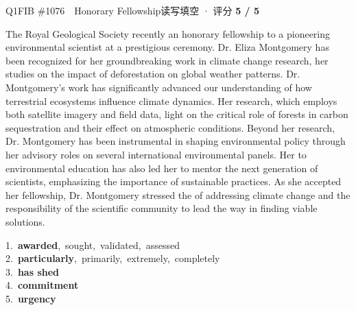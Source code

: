 \begin{qblock}{Q1\quad FIB \#1076\ \ Honorary Fellowship}{读写填空 · 评分 \textcolor{cAccent}{\bfseries 5 / 5}}
\begin{promptbox}
The Royal Geological Society recently  an honorary fellowship to a pioneering environmental scientist at a prestigious ceremony. Dr. Eliza Montgomery has been recognized for her groundbreaking work in climate change research,  her studies on the impact of deforestation on global weather patterns. Dr. Montgomery's work has significantly advanced our understanding of how terrestrial ecosystems influence climate dynamics. Her research, which employs both satellite imagery and field data,  light on the critical role of forests in carbon sequestration and their effect on atmospheric conditions. Beyond her research, Dr. Montgomery has been instrumental in shaping environmental policy through her advisory roles on several international environmental panels. Her  to environmental education has also led her to mentor the next generation of scientists, emphasizing the importance of sustainable practices. As she accepted her fellowship, Dr. Montgomery stressed the  of addressing climate change and the responsibility of the scientific community to lead the way in finding viable solutions.
\end{promptbox}
{\small
1.\ \textbf{awarded},\ sought,\ validated,\ assessed\\
2.\ \textbf{particularly},\ primarily,\ extremely,\ completely\\
3.\ \textbf{has shed}\\
4.\ \textbf{commitment}\\
5.\ \textbf{urgency}}

\end{qblock}
